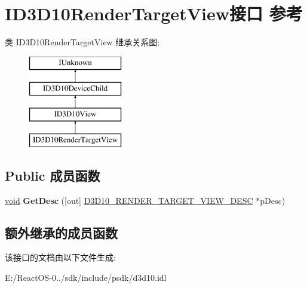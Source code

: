\hypertarget{interface_i_d3_d10_render_target_view}{}\section{I\+D3\+D10\+Render\+Target\+View接口 参考}
\label{interface_i_d3_d10_render_target_view}
类 I\+D3\+D10\+Render\+Target\+View 继承关系图\+:\begin{figure}[H]
\begin{center}
\leavevmode
\includegraphics[height=4.000000cm]{interface_i_d3_d10_render_target_view}
\end{center}
\end{figure}
\subsection*{Public 成员函数}
\begin{DoxyCompactItemize}
\item 
\mbox{\label{interface_i_d3_d10_render_target_view_a73ab06b7b33ae9c5a8bca1ac857672e4}} 
\hyperlink{interfacevoid}{void} {\bfseries Get\+Desc} (\mbox{[}out\mbox{]} \hyperlink{struct_d3_d10___r_e_n_d_e_r___t_a_r_g_e_t___v_i_e_w___d_e_s_c}{D3\+D10\+\_\+\+R\+E\+N\+D\+E\+R\+\_\+\+T\+A\+R\+G\+E\+T\+\_\+\+V\+I\+E\+W\+\_\+\+D\+E\+SC} $\ast$p\+Desc)
\end{DoxyCompactItemize}
\subsection*{额外继承的成员函数}


该接口的文档由以下文件生成\+:\begin{DoxyCompactItemize}
\item 
E\+:/\+React\+O\+S-\/0../sdk/include/psdk/d3d10.\+idl\end{DoxyCompactItemize}
